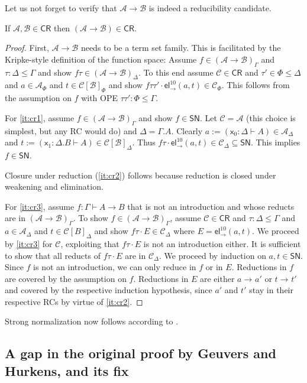 \documentclass[a4paper,USenglish,cleveref, autoref, thm-restate]{lipics-v2019}
\newcommand{\x}{\mathsf{x}}
\newcommand{\tel}{\mathsf{el}}
\newcommand{\el}[2]{\ensuremath{\tel_{#1}^{#2}}}
\newcommand{\red}[1][]{\longrightarrow_{#1}}
\newcommand{\CR}{\mathsf{CR}}
\newcommand{\A}{\mathcal{A}}
\newcommand{\B}{\mathcal{B}}
\newcommand{\C}{\mathcal{C}}
\newcommand{\SN}{\mathsf{SN}}
\begin{document}
Let us not forget to verify that $\A \to \B$ is indeed a reducibility
candidate.
\begin{lemma}
  \label{lem:funcr}
  If $\A,\B \in \CR$ then $(\A \to \B) \in \CR$.
\end{lemma}
\begin{proof}
  First, $\A \to \B$ needs to be a term set family.
  This is facilitated by the Kripke-style definition of the function space:
  Assume $f \in (\A \to \B)_\Gamma$ and $\tau : \Delta \leq \Gamma$
  and show $f \tau \in (\A \to \B)_\Delta$.  To this end assume $\C
  \in \CR$ and $\tau' \in \Phi \leq \Delta$ and $a \in \A_\Phi$ and $t
  \in \C[\B]_\Phi$ and show $f\tau\tau' \cdot \el\to{10}(a,t) \in
  \C_\Phi$.  This follows from the assumption on $f$ with OPE
  $\tau\tau' : \Phi \leq \Gamma$.

  For \ref{it:cr1}, assume $f \in (\A \to \B)_\Gamma$ and show $f \in \SN$.
  Let $\C = \A$ (this choice is simplest, but any RC would do) and
  $\Delta = \Gamma.A$.  Clearly $a := (\x_0 : \Delta \vdash A) \in
  \A_\Delta$ and $t := (\x_1 : \Delta.B \vdash A) \in \C[\B]_\Delta$.
  Thus $f\tau \cdot \el\to{10}(a,t) \in \C_\Delta \subseteq \SN$.
  This implies $f \in \SN$.

  Closure under reduction (\ref{it:cr2}) follows because reduction is
  closed under weakening and elimination.

  For \ref{it:cr3}, assume $f : \Gamma \vdash A \to B$ that is not an
  introduction and whose reducts are in $(\A \to \B)_\Gamma$.  To show
  $f \in (\A \to \B)_\Gamma$, assume $\C \in \CR$ and $\tau : \Delta \leq \Gamma$ and
  $a \in \A_\Delta$ and $t \in \C[B]_\Delta$ and show $f\tau \cdot E \in
  \C_\Delta$ where $E = \el\to{10}(a,t)$.  We proceed by \ref{it:cr3}
  for $\C$, exploiting that $f\tau \cdot E$ is not an introduction
  either.  It is sufficient to show that all reducts of $f\tau \cdot
  E$ are in $\C_\Delta$.  We proceed by induction on $a,t \in \SN$.
  Since $f$ is not an introduction, we can only reduce in $f$ or in $E$.
  Reductions in $f$ are covered by the assumption on $f$.
  Reductions in $E$ are either $a \red a' $ or $t \red t'$ and covered by the
  respective induction hypothesis, since $a'$ and $t'$ stay in their
  respective RCs by virtue of \ref{it:cr2}.
\end{proof}

Strong normalization now follows according to .

\subsection{A gap in the original proof by Geuvers and Hurkens, and its fix}
\label{sec:gap}
\end{document}

